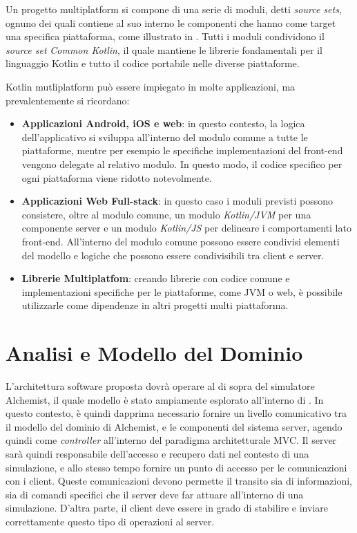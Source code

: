 Un progetto multiplatform si compone di una serie di moduli, detti \textit{source sets}, ognuno dei quali contiene al suo interno le componenti che
hanno come target una specifica piattaforma, come illustrato in . Tutti i moduli condividono il \textit{source set} \textit{Common Kotlin}, il quale mantiene le librerie
fondamentali per il linguaggio Kotlin e tutto il codice portabile nelle diverse piattaforme.


Kotlin mutliplatform può essere impiegato in molte applicazioni, ma prevalentemente si ricordano:
\begin{itemize}
    \item \textbf{Applicazioni Android, iOS e web}: in questo contesto, la logica dell'applicativo si sviluppa all'interno del modulo comune a tutte
        le piattaforme, mentre per esempio le specifiche implementazioni del front-end vengono delegate al relativo modulo. In questo modo, il codice
        specifico per ogni piattaforma viene ridotto notevolmente.
    \item \textbf{Applicazioni Web Full-stack}: in questo caso i moduli previsti possono consistere, oltre al modulo comune, un modulo \textit{Kotlin/JVM}
        per una componente server e un modulo \textit{Kotlin/JS} per delineare i comportamenti lato front-end. All'interno del modulo comune possono essere condivisi elementi del modello e
        logiche che possono essere condivisibili tra client e server.
    \item \textbf{Librerie Multiplatfom}: creando librerie con codice comune e implementazioni specifiche per le piattaforme, come JVM o web, è possibile
        utilizzarle come dipendenze in altri progetti multi piattaforma.
\end{itemize}

\section{Analisi e Modello del Dominio}\label{sec:domain-model}
L'architettura software proposta dovrà operare al di sopra del simulatore Alchemist, il quale modello è stato ampiamente esplorato all'interno di .
In questo contesto, è quindi dapprima necessario fornire un livello comunicativo tra il modello del dominio di Alchemist,
e le componenti del sistema server, agendo quindi come \textit{controller} all'interno del paradigma architetturale \ac{MVC}.
Il server sarà quindi responsabile dell'accesso e recupero dati nel contesto
di una simulazione, e allo stesso tempo fornire un punto di accesso per le comunicazioni con i client. Queste comunicazioni devono permette il transito sia di informazioni, sia di comandi specifici che il
server deve far attuare all'interno di  una simulazione. D'altra parte, il client deve essere in grado di stabilire e inviare correttamente questo tipo di operazioni al server.


